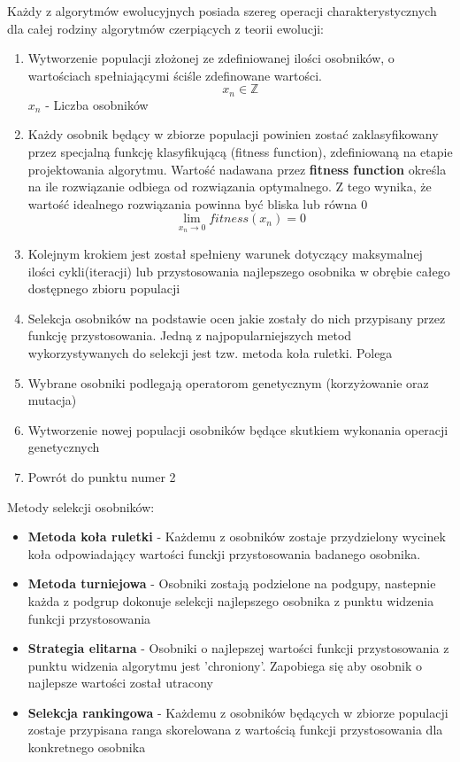 \documentclass[eng, pl, oneside, openright, final, openbib]{mgr}\DeclareUnicodeCharacter{0301}{\'{e}}
\begin{document}
Każdy z algorytmów ewolucyjnych posiada szereg operacji charakterystycznych dla całej rodziny algorytmów czerpiących z teorii ewolucji:
\newline
\begin{enumerate}
\item Wytworzenie populacji złożonej ze zdefiniowanej ilości osobników, o wartościach spełniającymi ściśle zdefinowane wartości.
\begin{equation}
x_{n} \in \mathbb{Z}
\end{equation}
$x_{n}$ - Liczba osobników
\item Każdy osobnik będący w zbiorze populacji powinien zostać zaklasyfikowany przez specjalną funkcję klasyfikującą (fitness function), zdefiniowaną na etapie projektowania algorytmu. Wartość nadawana przez \textbf{fitness function} określa na ile rozwiązanie odbiega od rozwiązania optymalnego. Z tego wynika, że wartość idealnego rozwiązania powinna być bliska lub równa 0 \newline
\begin{equation}
\lim_{x_{n} \rightarrow 0} fitness(x_{n}) = 0 
\end{equation}
\item Kolejnym krokiem jest został spełnieny warunek dotyczący maksymalnej ilości cykli(iteracji) lub przystosowania najlepszego osobnika w obrębie całego dostępnego zbioru populacji
\item Selekcja osobników na podstawie ocen jakie zostały do nich przypisany przez funkcję przystosowania. Jedną z najpopularniejszych metod wykorzystywanych do selekcji jest tzw. metoda koła ruletki. Polega 
\item Wybrane osobniki podlegają operatorom genetycznym (korzyżowanie oraz mutacja)
\item Wytworzenie nowej populacji osobników będące skutkiem wykonania operacji genetycznych
\item Powrót do punktu numer 2
\end{enumerate}

Metody selekcji osobników:
\begin{itemize}
\item \textbf{Metoda koła ruletki} - Każdemu z osobników zostaje przydzielony wycinek koła odpowiadający wartości funckji przystosowania badanego osobnika. 
\item \textbf{Metoda turniejowa} - Osobniki zostają podzielone na podgupy, nastepnie każda z podgrup dokonuje selekcji najlepszego osobnika z punktu widzenia funkcji przystosowania 
\item \textbf{Strategia elitarna} - Osobniki o najlepszej wartości funkcji przystosowania z punktu widzenia algorytmu jest 'chroniony'. Zapobiega się aby osobnik o najlepsze wartości został utracony 
\item \textbf{Selekcja rankingowa} - Każdemu z osobników będących w zbiorze  populacji zostaje przypisana ranga skorelowana z wartością funkcji przystosowania dla konkretnego osobnika
\end{itemize}
\end{document}
